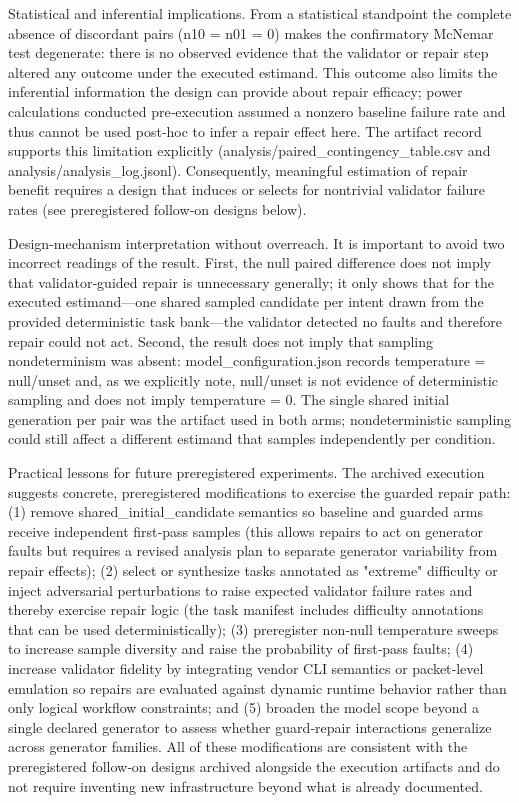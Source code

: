 \documentclass[conference]{IEEEtran}
\begin{document}
Statistical and inferential implications. From a statistical standpoint the complete absence of discordant pairs (n10 = n01 = 0) makes the confirmatory McNemar test degenerate: there is no observed evidence that the validator or repair step altered any outcome under the executed estimand. This outcome also limits the inferential information the design can provide about repair efficacy; power calculations conducted pre‑execution assumed a nonzero baseline failure rate and thus cannot be used post‑hoc to infer a repair effect here. The artifact record supports this limitation explicitly (analysis/paired\_contingency\_table.csv and analysis/analysis\_log.jsonl). Consequently, meaningful estimation of repair benefit requires a design that induces or selects for nontrivial validator failure rates (see preregistered follow‑on designs below).

Design‑mechanism interpretation without overreach. It is important to avoid two incorrect readings of the result. First, the null paired difference does not imply that validator‑guided repair is unnecessary generally; it only shows that for the executed estimand---one shared sampled candidate per intent drawn from the provided deterministic task bank---the validator detected no faults and therefore repair could not act. Second, the result does not imply that sampling nondeterminism was absent: model\_configuration.json records temperature = null/unset and, as we explicitly note, null/unset is not evidence of deterministic sampling and does not imply temperature = 0. The single shared initial generation per pair was the artifact used in both arms; nondeterministic sampling could still affect a different estimand that samples independently per condition.

Practical lessons for future preregistered experiments. The archived execution suggests concrete, preregistered modifications to exercise the guarded repair path: (1) remove shared\_initial\_candidate semantics so baseline and guarded arms receive independent first‑pass samples (this allows repairs to act on generator faults but requires a revised analysis plan to separate generator variability from repair effects); (2) select or synthesize tasks annotated as "extreme" difficulty or inject adversarial perturbations to raise expected validator failure rates and thereby exercise repair logic (the task manifest includes difficulty annotations that can be used deterministically); (3) preregister non‑null temperature sweeps to increase sample diversity and raise the probability of first‑pass faults; (4) increase validator fidelity by integrating vendor CLI semantics or packet‑level emulation so repairs are evaluated against dynamic runtime behavior rather than only logical workflow constraints; and (5) broaden the model scope beyond a single declared generator to assess whether guard‑repair interactions generalize across generator families. All of these modifications are consistent with the preregistered follow‑on designs archived alongside the execution artifacts and do not require inventing new infrastructure beyond what is already documented.
\end{document}
